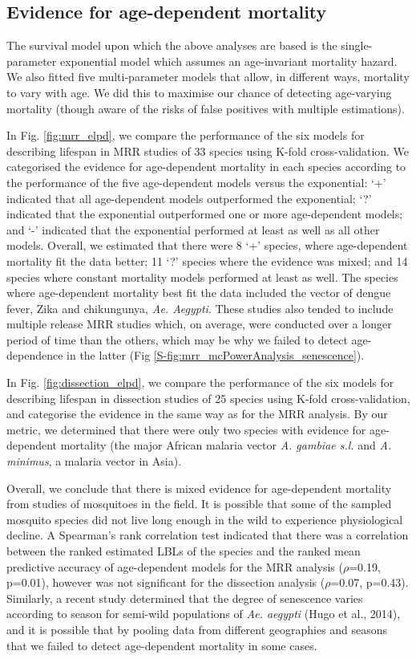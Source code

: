 \documentclass[]{article}
\begin{document}
\subsection{Evidence for age-dependent
mortality}\label{evidence-for-age-dependent-mortality}

The survival model upon which the above analyses are based is the
single-parameter exponential model which assumes an age-invariant
mortality hazard. We also fitted five multi-parameter models that allow,
in different ways, mortality to vary with age. We did this to maximise
our chance of detecting age-varying mortality (though aware of the risks
of false positives with multiple estimations).

In Fig. \ref{fig:mrr_elpd}, we compare the performance of the six models for describing
lifespan in MRR studies of 33 species using K-fold cross-validation. We
categorised the evidence for age-dependent mortality in each species
according to the performance of the five age-dependent models versus the
exponential: `+' indicated that all age-dependent models outperformed
the exponential; `?' indicated that the exponential outperformed one or
more age-dependent models; and `-' indicated that the exponential
performed at least as well as all other models. Overall, we estimated
that there were 8 `+' species, where age-dependent mortality fit the
data better; 11 `?' species where the evidence was mixed; and 14 species
where constant mortality models performed at least as well. The species
where age-dependent mortality best fit the data included the
vector of dengue fever, Zika and chikungunya, \emph{Ae. Aegypti}. These
studies also tended to include multiple release MRR studies which, on
average, were conducted over a longer period of time than the others,
which may be why we failed to detect age-dependence in the latter (Fig
\ref{S-fig:mrr_mcPowerAnalysis_senescence}).

In Fig. \ref{fig:dissection_elpd}, we compare the performance of the six models for describing
lifespan in dissection studies of 25 species using K-fold
cross-validation, and categorise the evidence in the same way as for the
MRR analysis. By our metric, we determined that there were only two
species with evidence for age-dependent mortality (the major African
malaria vector \emph{A. gambiae s.l.} and \emph{A. minimus}, a malaria
vector in Asia).

Overall, we conclude that there is mixed evidence for age-dependent
mortality from studies of mosquitoes in the field. It is possible that
some of the sampled mosquito species did not live long enough in the
wild to experience physiological decline. A Spearman's rank correlation
test indicated that there was a correlation between the ranked estimated
LBLs of the species and the ranked mean predictive accuracy of
age-dependent models for the MRR analysis ($\rho$=0.19, p=0.01), however was
not significant for the dissection analysis ($\rho$=0.07, p=0.43). Similarly,
a recent study determined that the degree of senescence varies according
to season for semi-wild populations of \emph{Ae. aegypti} (Hugo et al.,
2014), and it is possible that by pooling data from different
geographies and seasons that we failed to detect age-dependent mortality
in some cases.
\end{document}

